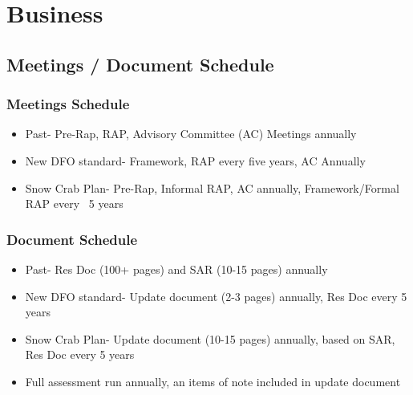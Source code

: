 \documentclass{beamer}
\numberwithin{equation}{section}		%
\numberwithin{figure}{section}		%
\numberwithin{table}{section}				%
\begin{document}
\section{Business}
\subsection{Meetings / Document Schedule}

\begin{frame}

\frametitle{Meetings Schedule}

 \vspace*{-0.5cm}
\begin{block}

\begin{itemize}
\item Past- Pre-Rap, RAP, Advisory Committee (AC) Meetings annually
\item New DFO standard- Framework, RAP every five years, AC Annually
\item Snow Crab Plan- Pre-Rap, Informal RAP, AC annually, Framework/Formal RAP every ~5 years

\end{itemize}
\end{block}
\end{frame}



\begin{frame}

\frametitle{Document Schedule}

 \vspace*{-0.5cm}
\begin{block}

\begin{itemize}
\item Past- Res Doc (100+ pages) and SAR (10-15 pages) annually
\item New DFO standard- Update document (2-3 pages) annually, Res Doc every 5 years
\item Snow Crab Plan- Update document (10-15 pages) annually, based on SAR, Res Doc every 5 years
\item Full assessment run annually, an items of note included in update document

\end{itemize}

\end{block}

\end{frame}
\end{document}
